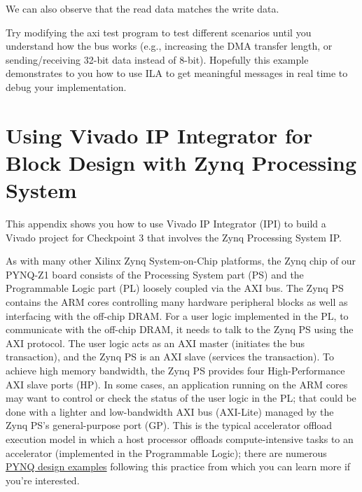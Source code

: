 \documentclass[11pt]{article}
\begin{document}
\begin{center}
\end{center}

We can also observe that the read data matches the write data.

\begin{center}
\end{center}

Try modifying the axi test program to test different scenarios until you understand how the bus works (e.g., increasing the DMA transfer length, or sending/receiving 32-bit data instead of 8-bit). Hopefully this example demonstrates to you how to use ILA to get meaningful messages in real time to debug your implementation.

\newpage
\section{Using Vivado IP Integrator for Block Design with Zynq Processing System}
\label{sec:vivado_bd}

This appendix shows you how to use Vivado IP Integrator (IPI) to build a Vivado project for Checkpoint 3 that involves the Zynq Processing System IP.

As with many other Xilinx Zynq System-on-Chip platforms, the Zynq chip of our PYNQ-Z1 board consists of the Processing System part (PS) and the Programmable Logic part (PL) loosely coupled via the AXI bus. The Zynq PS contains the ARM cores controlling many hardware peripheral blocks as well as interfacing with the off-chip DRAM. For a user logic implemented in the PL, to communicate with the off-chip DRAM, it needs to talk to the Zynq PS using the AXI protocol. The user logic acts as an AXI master (initiates the bus transaction), and the Zynq PS is an AXI slave (services the transaction). To achieve high memory bandwidth, the Zynq PS provides four High-Performance AXI slave ports (HP). In some cases, an application running on the ARM cores may want to control or check the status of the user logic in the PL; that could be done with a lighter and low-bandwidth AXI bus (AXI-Lite) managed by the Zynq PS's general-purpose port (GP). This is the typical accelerator offload execution model in which a host processor offloads compute-intensive tasks to an accelerator (implemented in the Programmable Logic); there are numerous \href{http://www.pynq.io/examples}{PYNQ design examples} following this practice from which you can learn more if you're interested.
\end{document}
